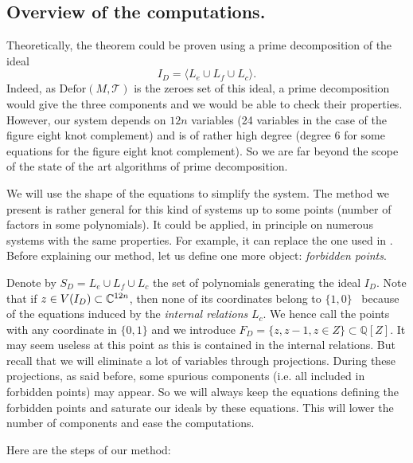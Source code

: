 \subsection{Overview of the computations.}

Theoretically, the theorem could be proven using a prime decomposition of the ideal 
$$I_D=\langle L_{e} \cup L_{f}\cup L_{c} \rangle.$$
Indeed, as $\mathrm{Defor}(M, \mathcal T)$ is the zeroes set of this ideal, a prime decomposition would give the three components and we would be able to check their properties.
However, our system depends on $12n$ variables (24 variables in the
case of the figure eight knot complement) and is of rather high degree
(degree $6$ for some equations for the figure eight knot complement). So we are far beyond the scope of the state of the art algorithms of prime decomposition.

We will use the shape of the equations to simplify the system. The method we present is rather general for this kind of systems up to some points (number of factors
in some polynomials). It could be applied, in principle on numerous systems
with the same properties. For example, it can replace the one used in \cite{FKR14}.
Before explaining our method, let us define one more object: \emph{forbidden points}. 

Denote by $S_{D}=L_{e} \cup L_{f}\cup L_{c}$ the set of polynomials generating the ideal $I_{D}$.
Note that if $z \in V ( I_{D} )\subset \mathbb{C}^{12n}$, then none of its coordinates
  belong to $\{ 1,0 \}$ \ because of the equations induced by the
  {\emph{internal relations}} $L_c$. We hence call {} the points with any coordinate in $\{ 0,1 \}$ and we introduce 
  $F_{D}= \{ z,z-1,z \in Z \} \subset \mathbb{Q} [ Z ]$. It may seem useless at this point as this is contained in the internal relations.
  But recall that we will eliminate a lot of variables through projections. During these projections, as said before, some spurious components (i.e. all included in forbidden points) may appear. So we will always keep the equations defining the forbidden points and saturate our ideals by these equations. This will lower the number of components and ease the computations.
  
 Here are the steps of our method: 
 
